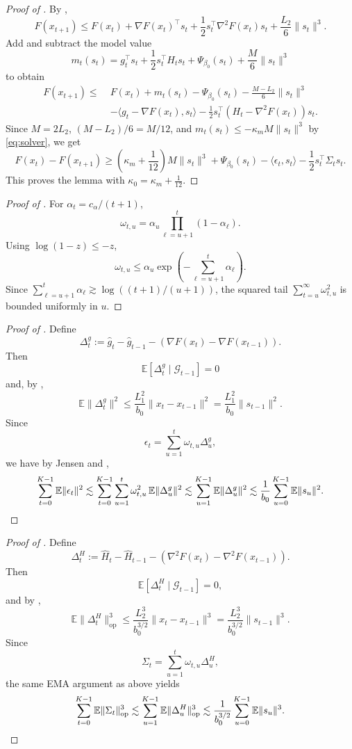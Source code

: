 \documentclass{article}
\theoremstyle{plain}
\theoremstyle{definition}
\theoremstyle{remark}
\begin{document}
\begin{proof}[Proof of ]
By ,
\[
F(x_{t+1})
\le
F(x_t)+\nabla F(x_t)^\top s_t+\frac12 s_t^\top \nabla^2F(x_t)s_t+\frac{L_2}{6}\|s_t\|^3.
\]
Add and subtract the model value
\[
m_t(s_t)=g_t^\top s_t+\frac12 s_t^\top H_t s_t+\Psi_{\beta_0}(s_t)+\frac M6\|s_t\|^3
\]
to obtain
\begin{align*}
F(x_{t+1})
\le\;&
F(x_t)+m_t(s_t)-\Psi_{\beta_0}(s_t)-\frac{M-L_2}{6}\|s_t\|^3\\
&-\langle g_t-\nabla F(x_t),s_t\rangle-\frac12 s_t^\top(H_t-\nabla^2F(x_t))s_t.
\end{align*}
Since \(M=2L_2\), \((M-L_2)/6=M/12\), and \(m_t(s_t)\le -\kappa_m M\|s_t\|^3\) by \eqref{eq:solver}, we get
\[
F(x_t)-F(x_{t+1})
\ge
\left(\kappa_m+\frac1{12}\right)M\|s_t\|^3+\Psi_{\beta_0}(s_t)
-\langle \epsilon_t,s_t\rangle-\frac12 s_t^\top \Sigma_t s_t.
\]
This proves the lemma with \(\kappa_0=\kappa_m+\frac1{12}\).
\end{proof}

\begin{proof}[Proof of ]
For \(\alpha_t=c_\alpha/(t+1)\),
\[
\omega_{t,u}=\alpha_u\prod_{\ell=u+1}^t(1-\alpha_\ell).
\]
Using \(\log(1-z)\le -z\),
\[
\omega_{t,u}\le \alpha_u \exp\!\left(-\sum_{\ell=u+1}^t \alpha_\ell\right).
\]
Since \(\sum_{\ell=u+1}^t \alpha_\ell\gtrsim \log((t+1)/(u+1))\), the squared tail \(\sum_{t=u}^\infty \omega_{t,u}^2\) is bounded uniformly in \(u\).
\end{proof}

\begin{proof}[Proof of ]
Define
\[
\Delta_t^g:=\hat g_t-\hat g_{t-1}-(\nabla F(x_t)-\nabla F(x_{t-1})).
\]
Then
\[
\mathbb E[\Delta_t^g\mid \mathcal G_{t-1}]=0
\]
and, by ,
\[
\mathbb E\|\Delta_t^g\|^2
\le
\frac{L_1^2}{b_0}\|x_t-x_{t-1}\|^2
=
\frac{L_1^2}{b_0}\|s_{t-1}\|^2.
\]
Since
\[
\epsilon_t=\sum_{u=1}^t \omega_{t,u}\Delta_u^g,
\]
we have by Jensen and ,
\[
\sum_{t=0}^{K-1}\mathbb E\|\epsilon_t\|^2
\lesssim
\sum_{t=0}^{K-1}\sum_{u=1}^t \omega_{t,u}^2 \,\mathbb E\|\Delta_u^g\|^2
\lesssim
\sum_{u=1}^{K-1}\mathbb E\|\Delta_u^g\|^2
\lesssim
\frac1{b_0}\sum_{u=0}^{K-1}\mathbb E\|s_u\|^2.
\qedhere
\]
\end{proof}

\begin{proof}[Proof of ]
Define
\[
\Delta_t^H:=\hat H_t-\hat H_{t-1}-(\nabla^2F(x_t)-\nabla^2F(x_{t-1})).
\]
Then
\[
\mathbb E[\Delta_t^H\mid \mathcal G_{t-1}]=0,
\]
and by ,
\[
\mathbb E\|\Delta_t^H\|_{\mathrm{op}}^3
\le
\frac{L_2^3}{b_0^{3/2}}\|x_t-x_{t-1}\|^3
=
\frac{L_2^3}{b_0^{3/2}}\|s_{t-1}\|^3.
\]
Since
\[
\Sigma_t=\sum_{u=1}^t \omega_{t,u}\Delta_u^H,
\]
the same EMA argument as above yields
\[
\sum_{t=0}^{K-1}\mathbb E\|\Sigma_t\|_{\mathrm{op}}^3
\lesssim
\sum_{u=1}^{K-1}\mathbb E\|\Delta_u^H\|_{\mathrm{op}}^3
\lesssim
\frac1{b_0^{3/2}}\sum_{u=0}^{K-1}\mathbb E\|s_u\|^3.
\qedhere
\]
\end{proof}
\end{document}
